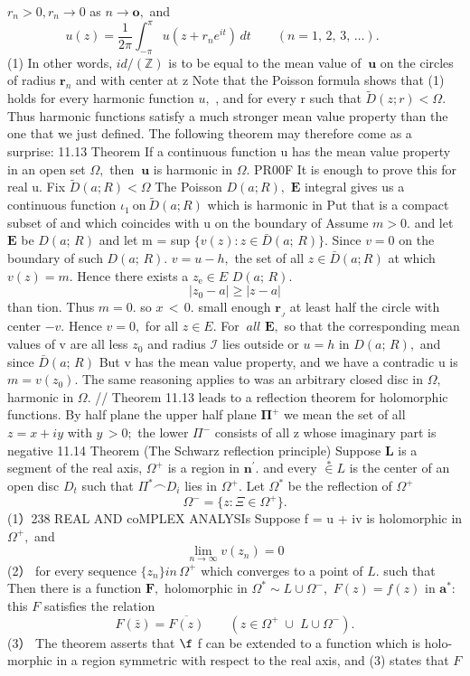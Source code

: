 $r_{n}>0,r_{n}\to0$ as $n\to\mathbf{o},$ and $$ u(z)=\frac{1}{2\pi}\left.\int_{-\pi}^{\pi}u(z+r_{n}e^{i t})\,d t\qquad(n=1,\,2,\,3,\,\dots).\qquad\right. $$ (1) In other words, $i d\!\!\!/(\mathbb{Z})$ is to be equal to the mean value of $\boldsymbol{\ u}$ on the circles of radius ${\boldsymbol{r}}_{n}$ and with center at z Note that the Poisson formula shows that (1) holds for every harmonic function $u,$ , and for every r such that ${\tilde{D}}(z;r)<\Omega.$ Thus harmonic functions satisfy a much stronger mean value property than the one that we just defined. The following theorem may therefore come as a surprise: 11.13 Theorem If a continuous function u has the mean value property in an open set $\Omega,$ then $\boldsymbol{\ u}$ is harmonic in $\Omega.$ PR00F It is enough to prove this for real u. Fix ${\tilde{D}}(a;R)<\Omega$ The Poisson $D(a;R),$ $\boldsymbol{E}$ integral gives us a continuous function $\iota_{1}\ \mathrm{on}\ \tilde{D}(a;R)$ which is harmonic in Put that is a compact subset of and which coincides with u on the boundary of Assume $m>0.$ and let $\boldsymbol{E}$ be $D(a;\,R)$ and let m = sup $\{v(z)\colon z\in{\bar{D}}(a;\,R)\}.$ Since $v=0$ on the boundary of such $D(a;\,R).$ $v=u-h,$ the set of all $z\in{\bar{D}}(a;R)$ at which $v(z)=m.$ Hence there exists a $\scriptstyle z_{\mathrm{e}}\in E$ $D(a;\,R).$ $$ |z_{0}-a|\geq|z-a| $$ than tion. Thus $\scriptstyle m=0.$ so $\scriptstyle x\,<\,0.$ small enough ${\boldsymbol{r}}_{\!_{J}}$ at least half the circle with center $-v.$ Hence $v=0,$ for all $z\in E.$ For $\ a l l$ ${\boldsymbol{E}},$ so that the corresponding mean values of v are all less $z_{\mathrm{0}}$ and radius $\scriptstyle{\mathcal{I}}$ lies outside or $u=h$ in $D(a;\,R),$ and since ${\bar{D}}(a;\,R)$ But v has the mean value property, and we have a contradic u is $m=v(z_{0}).$ The same reasoning applies to was an arbitrary closed disc in $\Omega,$ harmonic in $\Omega.$ // Theorem 11.13 leads to a reflection theorem for holomorphic functions. By half plane the upper half plane ${\boldsymbol{\Pi}}^{+}$ we mean the set of all $z=x+i y$ with $\scriptstyle y\,>0;$ the lower $\Pi^{-}$ consists of all z whose imaginary part is negative 11.14 Theorem (The Schwarz reflection principle) Suppose ${\boldsymbol{L}}$ is a segment of the real axis, $\Omega^{+}$ is a region in $\mathbf{n}^{\prime}.$ and every $\overset{*}{\in}L$ is the center of an open disc $D_{t}$ such that $\Pi^{*}\frown D_{i}$ lies in $\Omega^{+}.$ Let $\Omega^{*}$ be the reflection of $\Omega^{+}$ $$ \Omega^{-}=\{z\colon\Xi\in\Omega^{+}\}. $$ (1）238 REAL AND coMPLEX ANALYSIs Suppose f = u + iv is holomorphic in $\Omega^{+},$ and $$ \operatorname*{lim}_{n\to\infty}v(z_{n})=0 $$ (2） for every sequence $\{z_{n}\}i n\,\Omega^{+}$ which converges to a point of $L.$ such that Then there is a function ${\boldsymbol{F}},$ holomorphic in $\Omega^{*}\sim L\cup\Omega^{-},$ $F(z)=f(z)$ in $\mathbf{a}^{*}\!:$ this ${\mathbf{}}F$ satisfies the relation $$ F(\bar{z})=\overline{{{F(z)}}}\;\;\;\;\;\;\;(z\in\Omega^{+}\;\cup\;L\cup\Omega^{-}). $$ (3） The theorem asserts that $\boldsymbol{\f}$ f can be extended to a function which is holo- morphic in a region symmetric with respect to the real axis, and (3) states that ${\mathbf{}}F$ 